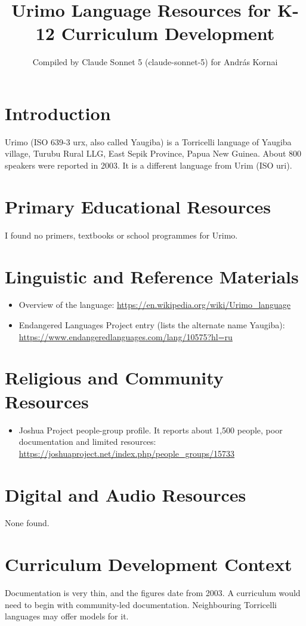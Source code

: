 \documentclass[12pt]{article}
\title{Urimo Language Resources for K-12 Curriculum Development}
\author{Compiled by Claude Sonnet 5 (claude-sonnet-5) for Andr\'as Kornai}
\date{}
\begin{document}
\maketitle

\section{Introduction}
Urimo (ISO 639-3 urx, also called Yaugiba) is a Torricelli language of Yaugiba village, Turubu Rural LLG, East Sepik Province, Papua New Guinea. About 800 speakers were reported in 2003. It is a different language from Urim (ISO uri).

\section{Primary Educational Resources}
I found no primers, textbooks or school programmes for Urimo.

\section{Linguistic and Reference Materials}
\begin{itemize}
\item Overview of the language: \url{https://en.wikipedia.org/wiki/Urimo_language}
\item Endangered Languages Project entry (lists the alternate name Yaugiba): \url{https://www.endangeredlanguages.com/lang/10575?hl=ru}
\end{itemize}

\section{Religious and Community Resources}
\begin{itemize}
\item Joshua Project people-group profile. It reports about 1,500 people, poor documentation and limited resources: \url{https://joshuaproject.net/index.php/people_groups/15733}
\end{itemize}

\section{Digital and Audio Resources}
None found.

\section{Curriculum Development Context}
Documentation is very thin, and the figures date from 2003. A curriculum would need to begin with community-led documentation. Neighbouring Torricelli languages may offer models for it.
\end{document}
